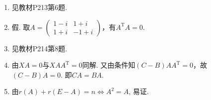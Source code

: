 \begin{enumerate}
    \item 见教材P213第6题.

    \item 假. 取$A=\begin{pmatrix}
                  1-i & 1+i  \\
                  1+i & -1+i
              \end{pmatrix}$，有$A^\mathrm{T}A=0$.

    \item 见教材P214第8题.

    \item 由$XA=0$与$XAA^{\mathrm{T}}=0$同解. 又由条件知$(C-B)AA^\mathrm{T}=0$，故$(C-B)A=0$. 即$CA=BA$.

    \item 由$r(A)+r(E-A)=n \iff A^2=A$, 易证.


\end{enumerate}
